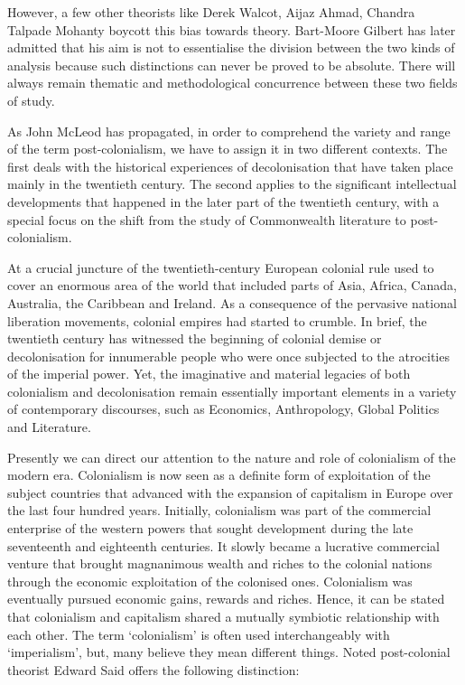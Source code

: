 However,  a  few  other  theorists  like  Derek  Walcot,  Aijaz  Ahmad,  Chandra  Talpade  Mohanty  boycott  this  bias  towards  theory.  Bart-Moore  Gilbert  has  later  admitted  that  his  aim  is  not  to  essentialise  the  division  between  the  two  kinds  of  analysis  because  such  distinctions  can  never  be  proved  to  be  absolute.  There  will  always  remain  thematic  and  methodological  concurrence  between  these  two  fields  of  study.  

As  John  McLeod  has  propagated,  in  order  to  comprehend  the  variety  and  range  of  the  term  post-colonialism,  we  have  to  assign  it  in  two  different  contexts.  The  first  deals  with  the  historical  experiences  of  decolonisation  that  have  taken  place  mainly  in  the  twentieth  century.  The  second  applies  to  the  significant  intellectual  developments  that  happened  in  the  later  part  of  the  twentieth  century,  with  a  special  focus  on  the  shift  from  the  study  of  Commonwealth  literature  to  post-colonialism.  

At  a  crucial  juncture  of  the  twentieth-century  European  colonial  rule  used  to  cover  an  enormous  area  of  the  world  that  included  parts  of  Asia,  Africa,  Canada,  Australia,  the  Caribbean  and  Ireland.  As  a  consequence  of  the  pervasive  national  liberation  movements,  colonial  empires  had  started  to  crumble.  In  brief,  the  twentieth  century  has  witnessed  the  beginning  of  colonial  demise  or  decolonisation  for  innumerable  people  who  were  once  subjected  to  the  atrocities  of  the  imperial  power.  Yet,  the  imaginative  and  material  legacies  of  both  colonialism  and  decolonisation  remain  essentially  important  elements  in  a  variety  of  contemporary  discourses,  such  as  Economics,  Anthropology,  Global  Politics  and  Literature.  

Presently  we  can  direct  our  attention  to  the  nature  and  role  of  colonialism  of  the  modern  era.  Colonialism  is  now  seen  as  a  definite  form  of  exploitation  of  the  subject  countries  that  advanced  with  the  expansion  of  capitalism  in  Europe  over  the  last  four  hundred  years.  Initially,  colonialism  was  part  of  the  commercial  enterprise  of  the  western  powers  that  sought  development  during  the  late  seventeenth  and  eighteenth  centuries.  It  slowly  became  a  lucrative  commercial  venture  that  brought  magnanimous  wealth  and  riches  to  the  colonial  nations  through  the  economic  exploitation  of  the  colonised  ones.  Colonialism  was  eventually  pursued  economic  gains,  rewards  and  riches.  Hence,  it  can  be  stated  that  colonialism  and  capitalism  shared  a  mutually  symbiotic  relationship  with  each  other.  The  term  ‘colonialism’  is  often  used  interchangeably  with  ‘imperialism’,  but,  many  believe  they  mean  different  things.  Noted  post-colonial  theorist  Edward  Said  offers  the  following  distinction:  


